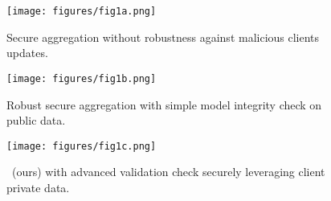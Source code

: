 
\begin{figure*}[t]
\centering

\begin{subfigure}{0.32\textwidth}
\texttt{[image: figures/fig1a.png]}
\caption{Secure aggregation without robustness against malicious clients updates.}
\label{fig:a_secure}
\end{subfigure}
\hspace{.1em}
\begin{subfigure}{0.32\textwidth}
\texttt{[image: figures/fig1b.png]}
\caption{Robust secure aggregation with simple model integrity check on public data.}
\label{fig:b_robust_with_publicval}
\end{subfigure}
\hspace{.1em}
\begin{subfigure}{0.32\textwidth}
\texttt{[image: figures/fig1c.png]}
\caption{\ours~(ours) with advanced validation check securely leveraging client private data.}
\label{fig:c_ours}
\end{subfigure}


\caption{ \textbf{Previous methods vs. \ours.}
Secure aggregation~(\ref{fig:a_secure}) lacks the means to check model integrity privately. Recent byzantine-robust secure aggregation schemes enable integrity checks with zero-knowledge proofs~(\ref{fig:b_robust_with_publicval}), but only support simple predicate (\eg $\ell_2$ norm of client update), and may rely on public datasets. ~\ours~securely leverages clients' local data for integrity checks via MPC~(\ref{fig:c_ours}), supporting more powerful predicates without requiring public data. 
}

\label{fig:ours-overview}
\end{figure*}
